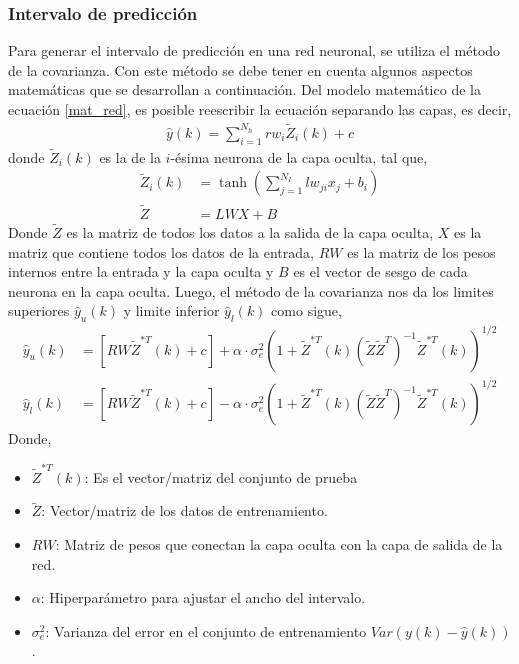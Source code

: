 \documentclass[12pt]{article}
\begin{document}
\subsubsection{Intervalo de predicción}
Para generar el intervalo de predicción en una red neuronal, se utiliza el método de la covarianza. Con este método se debe tener en cuenta algunos aspectos matemáticas que se desarrollan a continuación. Del modelo matemático de la ecuación \ref{mat_red}, es posible reescribir la ecuación separando las capas, es decir,
\begin{align}
\hat{y}(k) = \sum_{i=1}^{N_h} rw_i \tilde{Z}_i (k)  + c
\label{out_red}
\end{align}
donde $\tilde{Z}_i (k)$ es la de la $i$-ésima neurona de la capa oculta, tal que,
\begin{align}
	\tilde{Z}_i (k) &= \tanh\left(\sum_{j=1}^{N_I} lw_{ji} x_j + b_i\right) \nonumber \\
	\tilde{Z} &= LW X + B
\end{align}
Donde $\tilde{Z}$ es la matriz de todos los datos a la salida de la capa oculta, $X$ es la matriz que contiene todos los datos de la entrada, $RW$ es la matriz de los pesos internos entre la entrada y la capa oculta y $B$ es el vector de sesgo de cada neurona en la capa oculta. Luego, el método de la covarianza nos da los limites superiores $\hat{y}_u(k)$ y limite inferior $\hat{y}_l(k)$ como sigue,
\begin{align}
	\hat{y}_u(k) &= [RW \tilde{Z}^{*T}(k) + c] + \alpha \cdot \sigma_e^2 \left(1+\tilde{Z}^{*T}(k) \left(\tilde{Z} \tilde{Z}^T \right)^{-1} \tilde{Z}^{*T}(k) \right)^{1/2} \nonumber\\
	\hat{y}_l(k) &= [RW \tilde{Z}^{*T}(k) + c] - \alpha \cdot \sigma_e^2 \left(1 + \tilde{Z}^{*T}(k) \left(\tilde{Z} \tilde{Z}^T \right)^{-1} \tilde{Z}^{*T}(k) \right)^{1/2}
	\label{cov_red}
\end{align}
Donde,
\begin{itemize}
	\item $\tilde{Z}^{*T}(k)$: Es el vector/matriz del conjunto de prueba
	\item $\tilde{Z}$: Vector/matriz de los datos de entrenamiento.
	\item $RW$: Matriz de pesos que conectan la capa oculta con la capa de salida de la red.
	\item $\alpha$: Hiperparámetro para ajustar el ancho del intervalo.
	\item $\sigma_e^2$: Varianza del error en el conjunto de entrenamiento $Var(y(k) - \hat{y}(k))$.
\end{itemize}
\end{document}
